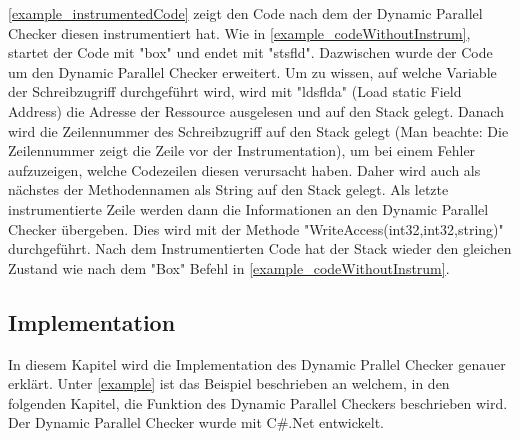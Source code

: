 \documentclass[10pt,a4paper]{article}
\begin{document}
\autoref{example_instrumentedCode} zeigt den Code nach dem der Dynamic Parallel Checker diesen instrumentiert hat. Wie in \autoref{example_codeWithoutInstrum}, startet der Code mit "box" und endet mit "stsfld". Dazwischen wurde der Code um den Dynamic Parallel Checker erweitert. Um zu wissen, auf welche Variable der Schreibzugriff durchgeführt wird, wird mit "ldsflda" (Load static Field Address) die Adresse der Ressource ausgelesen und auf den Stack gelegt. Danach wird die Zeilennummer des Schreibzugriff auf den Stack gelegt (Man beachte: Die Zeilennummer zeigt die Zeile vor der Instrumentation), um bei einem Fehler aufzuzeigen, welche Codezeilen diesen verursacht haben. Daher wird auch als nächstes der Methodennamen als String auf den Stack gelegt. Als letzte instrumentierte Zeile werden dann die Informationen an den Dynamic Parallel Checker übergeben. Dies wird mit der Methode "WriteAccess(int32,int32,string)" durchgeführt. Nach dem Instrumentierten Code hat der Stack wieder den gleichen Zustand wie nach dem "Box" Befehl in \autoref{example_codeWithoutInstrum}.
\subsection{Implementation}\label{implementation}
In diesem Kapitel wird die Implementation des Dynamic Prallel Checker genauer erklärt. Unter \ref{example} ist das Beispiel beschrieben an welchem, in den folgenden Kapitel, die Funktion des Dynamic Parallel Checkers beschrieben wird. Der Dynamic Parallel Checker wurde mit C\#.Net entwickelt.
\newpage
\end{document}
